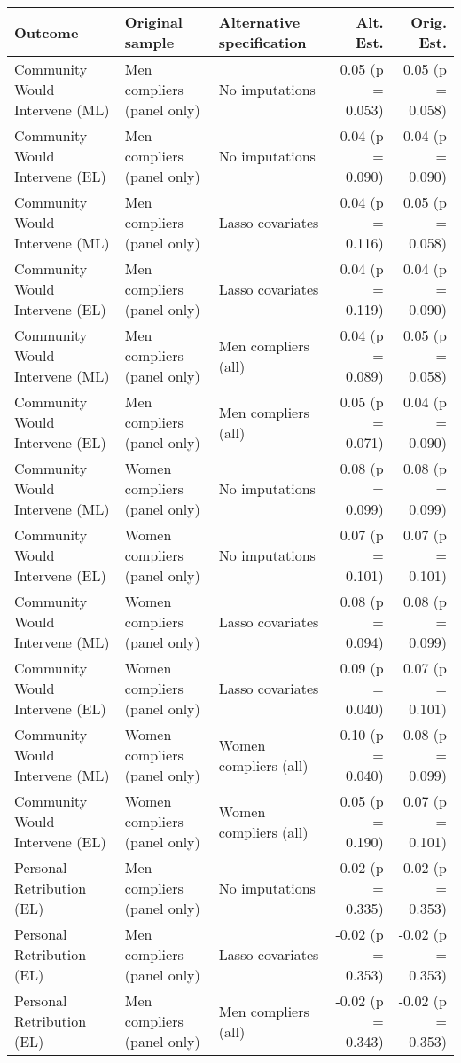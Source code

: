 \begin{tabular}{lllrr}
  \hline
Outcome & Original sample & Alternative specification & Alt. Est. & Orig. Est. \\ 
  \hline
Community Would Intervene (ML) & Men compliers (panel only) & No imputations & 0.05 (p = 0.053) & 0.05 (p = 0.058) \\ 
  Community Would Intervene (EL) & Men compliers (panel only) & No imputations & 0.04 (p = 0.090) & 0.04 (p = 0.090) \\ 
  Community Would Intervene (ML) & Men compliers (panel only) & Lasso covariates & 0.04 (p = 0.116) & 0.05 (p = 0.058) \\ 
  Community Would Intervene (EL) & Men compliers (panel only) & Lasso covariates & 0.04 (p = 0.119) & 0.04 (p = 0.090) \\ 
  Community Would Intervene (ML) & Men compliers (panel only) & Men compliers (all) & 0.04 (p = 0.089) & 0.05 (p = 0.058) \\ 
  Community Would Intervene (EL) & Men compliers (panel only) & Men compliers (all) & 0.05 (p = 0.071) & 0.04 (p = 0.090) \\ 
  Community Would Intervene (ML) & Women compliers (panel only) & No imputations & 0.08 (p = 0.099) & 0.08 (p = 0.099) \\ 
  Community Would Intervene (EL) & Women compliers (panel only) & No imputations & 0.07 (p = 0.101) & 0.07 (p = 0.101) \\ 
  Community Would Intervene (ML) & Women compliers (panel only) & Lasso covariates & 0.08 (p = 0.094) & 0.08 (p = 0.099) \\ 
  Community Would Intervene (EL) & Women compliers (panel only) & Lasso covariates & 0.09 (p = 0.040) & 0.07 (p = 0.101) \\ 
  Community Would Intervene (ML) & Women compliers (panel only) & Women compliers (all) & 0.10 (p = 0.040) & 0.08 (p = 0.099) \\ 
  Community Would Intervene (EL) & Women compliers (panel only) & Women compliers (all) & 0.05 (p = 0.190) & 0.07 (p = 0.101) \\ 
  Personal Retribution (EL) & Men compliers (panel only) & No imputations & -0.02 (p = 0.335) & -0.02 (p = 0.353) \\ 
  Personal Retribution (EL) & Men compliers (panel only) & Lasso covariates & -0.02 (p = 0.353) & -0.02 (p = 0.353) \\ 
  Personal Retribution (EL) & Men compliers (panel only) & Men compliers (all) & -0.02 (p = 0.343) & -0.02 (p = 0.353) \\ 

\end{tabular}
